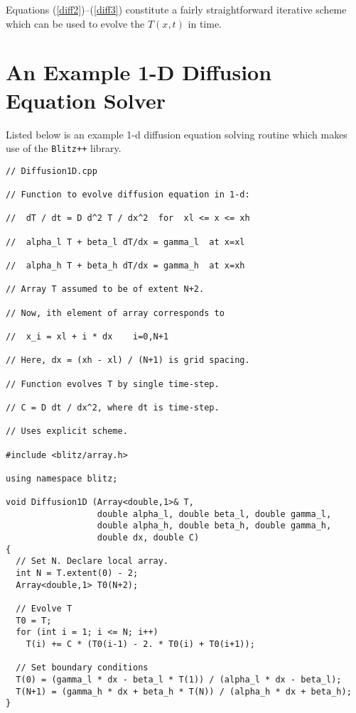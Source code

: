 Equations (\ref{diff2})--(\ref{diff3}) constitute a fairly straightforward iterative scheme which
can be used to evolve the $T(x,t)$ in time.

\section{An Example 1-D Diffusion Equation Solver}
Listed below is an example 1-d diffusion equation solving routine which
makes use of the {\tt Blitz++} library.
{\small\begin{verbatim}
// Diffusion1D.cpp

// Function to evolve diffusion equation in 1-d:

//  dT / dt = D d^2 T / dx^2  for  xl <= x <= xh

//  alpha_l T + beta_l dT/dx = gamma_l  at x=xl

//  alpha_h T + beta_h dT/dx = gamma_h  at x=xh

// Array T assumed to be of extent N+2.

// Now, ith element of array corresponds to

//  x_i = xl + i * dx    i=0,N+1

// Here, dx = (xh - xl) / (N+1) is grid spacing.

// Function evolves T by single time-step.

// C = D dt / dx^2, where dt is time-step.

// Uses explicit scheme.

#include <blitz/array.h>

using namespace blitz;

void Diffusion1D (Array<double,1>& T, 
                  double alpha_l, double beta_l, double gamma_l,
                  double alpha_h, double beta_h, double gamma_h,
                  double dx, double C)
{
  // Set N. Declare local array.
  int N = T.extent(0) - 2;
  Array<double,1> T0(N+2);	

  // Evolve T
  T0 = T;	
  for (int i = 1; i <= N; i++)
    T(i) += C * (T0(i-1) - 2. * T0(i) + T0(i+1));

  // Set boundary conditions
  T(0) = (gamma_l * dx - beta_l * T(1)) / (alpha_l * dx - beta_l);
  T(N+1) = (gamma_h * dx + beta_h * T(N)) / (alpha_h * dx + beta_h);
}
\end{verbatim}}

